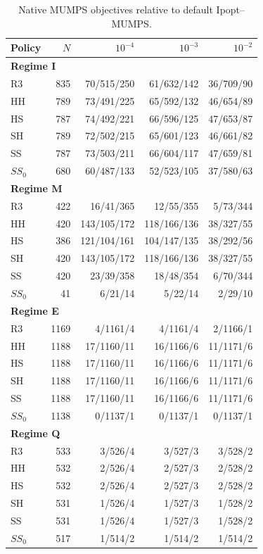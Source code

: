 \documentclass[pdflatex,sn-mathphys-num]{sn-jnl}
\theoremstyle{thmstyleone}
\theoremstyle{thmstylethree}
\begin{document}
\begin{table}[!htbp]
\centering\small
\caption{Native MUMPS objectives relative to default Ipopt--MUMPS.}
\label{tab:thresholds-native-mumps-mumps}

\begin{tabular}{lrrrr}
\toprule
Policy & $N$ & $10^{-4}$ & $10^{-3}$ & $10^{-2}$ \\
\midrule
\multicolumn{5}{l}{\textbf{Regime I}} \\
R3 & 835 & 70/515/250 & 61/632/142 & 36/709/90 \\
HH & 789 & 73/491/225 & 65/592/132 & 46/654/89 \\
HS & 787 & 74/492/221 & 66/596/125 & 47/653/87 \\
SH & 789 & 72/502/215 & 65/601/123 & 46/661/82 \\
SS & 787 & 73/503/211 & 66/604/117 & 47/659/81 \\
$SS_0$ & 680 & 60/487/133 & 52/523/105 & 37/580/63 \\
\midrule
\multicolumn{5}{l}{\textbf{Regime M}} \\
R3 & 422 & 16/41/365 & 12/55/355 & 5/73/344 \\
HH & 420 & 143/105/172 & 118/166/136 & 38/327/55 \\
HS & 386 & 121/104/161 & 104/147/135 & 38/292/56 \\
SH & 420 & 143/105/172 & 118/166/136 & 38/327/55 \\
SS & 420 & 23/39/358 & 18/48/354 & 6/70/344 \\
$SS_0$ & 41 & 6/21/14 & 5/22/14 & 2/29/10 \\
\midrule
\multicolumn{5}{l}{\textbf{Regime E}} \\
R3 & 1169 & 4/1161/4 & 4/1161/4 & 2/1166/1 \\
HH & 1188 & 17/1160/11 & 16/1166/6 & 11/1171/6 \\
HS & 1188 & 17/1160/11 & 16/1166/6 & 11/1171/6 \\
SH & 1188 & 17/1160/11 & 16/1166/6 & 11/1171/6 \\
SS & 1188 & 17/1160/11 & 16/1166/6 & 11/1171/6 \\
$SS_0$ & 1138 & 0/1137/1 & 0/1137/1 & 0/1137/1 \\
\midrule
\multicolumn{5}{l}{\textbf{Regime Q}} \\
R3 & 533 & 3/526/4 & 3/527/3 & 3/528/2 \\
HH & 532 & 2/526/4 & 2/527/3 & 2/528/2 \\
HS & 532 & 2/526/4 & 2/527/3 & 2/528/2 \\
SH & 531 & 1/526/4 & 1/527/3 & 1/528/2 \\
SS & 531 & 1/526/4 & 1/527/3 & 1/528/2 \\
$SS_0$ & 517 & 1/514/2 & 1/514/2 & 1/514/2 \\
\bottomrule
\end{tabular}


\end{table}
\end{document}
